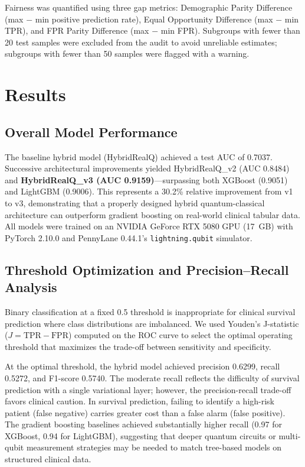 \documentclass[12pt, letterpaper]{article}
\begin{document}
Fairness was quantified using three gap metrics: Demographic Parity Difference (max $-$ min positive prediction rate), Equal Opportunity Difference (max $-$ min TPR), and FPR Parity Difference (max $-$ min FPR). Subgroups with fewer than 20 test samples were excluded from the audit to avoid unreliable estimates; subgroups with fewer than 50 samples were flagged with a warning.


\section{Results}

\subsection{Overall Model Performance}
The baseline hybrid model (HybridRealQ) achieved a test AUC of 0.7037. Successive architectural improvements yielded HybridRealQ\_v2 (AUC 0.8484) and \textbf{HybridRealQ\_v3 (AUC 0.9159)}---surpassing both XGBoost (0.9051) and LightGBM (0.9006). This represents a 30.2\% relative improvement from v1 to v3, demonstrating that a properly designed hybrid quantum-classical architecture can outperform gradient boosting on real-world clinical tabular data. All models were trained on an NVIDIA GeForce RTX 5080 GPU (17~GB) with PyTorch 2.10.0 and PennyLane 0.44.1's \texttt{lightning.qubit} simulator.

\subsection{Threshold Optimization and Precision--Recall Analysis}
Binary classification at a fixed 0.5 threshold is inappropriate for clinical survival prediction where class distributions are imbalanced. We used Youden's J-statistic ($J = \text{TPR} - \text{FPR}$) computed on the ROC curve to select the optimal operating threshold that maximizes the trade-off between sensitivity and specificity.

At the optimal threshold, the hybrid model achieved precision 0.6299, recall 0.5272, and F1-score 0.5740. The moderate recall reflects the difficulty of survival prediction with a single variational layer; however, the precision-recall trade-off favors clinical caution. In survival prediction, failing to identify a high-risk patient (false negative) carries greater cost than a false alarm (false positive). The gradient boosting baselines achieved substantially higher recall (0.97 for XGBoost, 0.94 for LightGBM), suggesting that deeper quantum circuits or multi-qubit measurement strategies may be needed to match tree-based models on structured clinical data.
\end{document}
